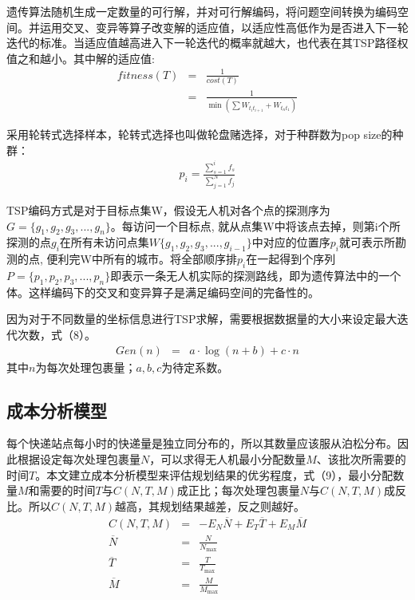 \documentclass[10.5pt,twocolumn]{jbuaa}
\begin{document}
	遗传算法随机生成一定数量的可行解，并对可行解编码，将问题空间转换为编码空间。并运用交叉、变异等算子改变解的适应值，以适应性高低作为是否进入下一轮迭代的标准。当适应值越高进入下一轮迭代的概率就越大，也代表在其TSP路径权值之和越小。其中解的适应值:
	\begin{eqnarray}
		fitness\left( T\right) &=&\frac {1}{cost\left( T\right) }\\
		&=&\frac {1}{\min \left( \sum W_{t_{i}t_{i+1}}+W_{t_{n}t_{1}}\right) }
	\end{eqnarray}

	采用轮转式选择样本，轮转式选择也叫做轮盘赌选择，对于种群数为pop size的种群：
	\begin{eqnarray}
		p_{i}=\frac {\sum ^{i}_{s=1}f_{s}}{\sum ^{N}_{j=1}f_{j}}
	\end{eqnarray}

	TSP编码方式是对于目标点集W，假设无人机对各个点的探测序为$G=\{g_{1},g_{2},g_{3},...,g_{n}\}$。每访问一个目标点, 就从点集W中将该点去掉，则第i个所探测的点$g_{i}$在所有未访问点集$W\{g_{1},g_{2},g_{3},...,g_{i-1}\}$中对应的位置序$p_{i}$就可表示所勘测的点, 便利完W中所有的城市。将全部顺序排$p_{i}$在一起得到个序列$P=\{p_{1},p_{2},p_{3},...,p_{n}\}$即表示一条无人机实际的探测路线，即为遗传算法中的一个体。这样编码下的交叉和变异算子是满足编码空间的完备性的。

	因为对于不同数量的坐标信息进行TSP求解，需要根据数据量的大小来设定最大迭代次数，式（8）。
	\begin{eqnarray}
		Gen\left( n\right) &=&a\cdot \log \left( n+b\right) +c\cdot n
	\end{eqnarray}
	其中$n$为每次处理包裹量；$a,b,c$为待定系数。












	\subsection{成本分析模型}
	每个快递站点每小时的快递量是独立同分布的，所以其数量应该服从泊松分布。因此根据设定每次处理包裹量$N$，可以求得无人机最小分配数量$M$、该批次所需要的时间$T$。本文建立成本分析模型来评估规划结果的优劣程度，式（9），最小分配数量$M$和需要的时间$T$与$C(N,T,M)$成正比；每次处理包裹量$N$与$C(N,T,M)$成反比。所以$C(N,T,M)$越高，其规划结果越差，反之则越好。
	\begin{eqnarray}
		C\left( N,T,M\right) &=& -E_{N} \overline N +E_{T}  \overline T+E_{M}  \overline M \\
		\overline N &=& \frac {N}{N_{\max }}\\
		\overline T &=& \frac {T}{T_{\max }}\\
		\overline M &=& \frac {M}{M_{\max }}
	\end{eqnarray}
\end{document}
